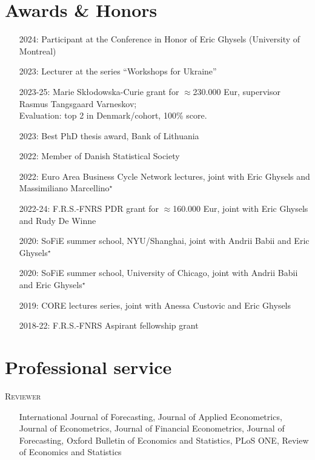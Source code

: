 \documentclass[10pt]{article}
\newcommand{\thestarnogap}{{\Large{\color{blue}\ensuremath{^\star}}}}
\begin{document}
	\section*{Awards \& Honors}
	\vspace{-0.5em}
	\begin{itemize}[leftmargin=4.5em]
		\setlength\itemsep{-0.1em}
		\item[2024:] Participant at the Conference in Honor of Eric Ghysels (University of Montreal)
		\item[2023:] Lecturer at the series ``Workshops for Ukraine''
		\item[2023-25:] Marie Skłodowska-Curie grant for $\approx$230.000 Eur, supervisor Rasmus Tangsgaard Varneskov; \\ %
		\hspace*{0.5em} Evaluation: top 2 in Denmark/cohort, 100\% score.
		\item[2023:] Best PhD thesis award, Bank of Lithuania
		\item[2022:] Member of Danish Statistical Society
		\item[2022:] Euro Area Business Cycle Network lectures, joint with Eric Ghysels and Massimiliano Marcellino\thestarnogap
		\item[2022-24:] F.R.S.-FNRS PDR grant for $\approx$160.000 Eur, joint with Eric Ghysels and Rudy De Winne
		\item[2020:] SoFiE summer school, NYU/Shanghai, joint with Andrii Babii and Eric Ghysels\thestarnogap
		\item[2020:] SoFiE summer school, University of Chicago, joint with Andrii Babii and Eric Ghysels\thestarnogap
		\item[2019:] CORE lectures series, joint with Anessa Custovic and Eric Ghysels
		\item[2018-22:] F.R.S.-FNRS Aspirant fellowship grant
	\end{itemize}
	
	

	
	\section*{Professional service}
	\vspace{-0.5em}
	\hspace{1em}\textsc{Reviewer}

	\begin{itemize}[leftmargin=1.5em]
		\setlength\itemsep{-0.1em}
		\item[]  International Journal of Forecasting, Journal of Applied Econometrics, Journal of Econometrics, Journal of Financial Econometrics, Journal of Forecasting, Oxford Bulletin of Economics and Statistics,  PLoS ONE, Review of Economics and Statistics
	\end{itemize}
	
\end{document}

